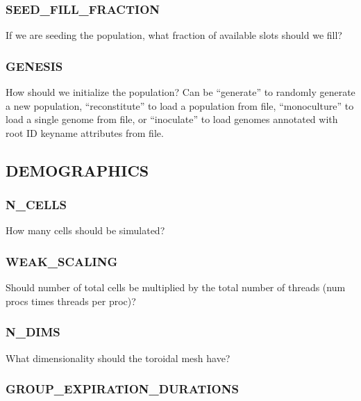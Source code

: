 \subsubsection{SEED\_FILL\_FRACTION}


If we are seeding the population, what fraction of available slots should we fill?

\subsubsection{GENESIS}


How should we initialize the population?
Can be ``generate'' to randomly generate a new population, ``reconstitute'' to load a population from file, ``monoculture'' to load a single genome from file, or ``inoculate'' to load genomes annotated with root ID keyname attributes from file.


\subsection{DEMOGRAPHICS}


\subsubsection{N\_CELLS}


How many cells should be simulated?

\subsubsection{WEAK\_SCALING}


Should number of total cells be multiplied by the total number of threads (num procs times threads per proc)?

\subsubsection{N\_DIMS}


What dimensionality should the toroidal mesh have?

\subsubsection{GROUP\_EXPIRATION\_DURATIONS}

